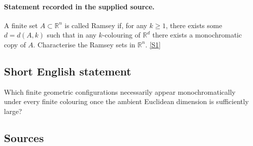 \documentclass[11pt,a4paper]{article}
\newcommand{\sref}[2]{\hyperlink{source:#1:#2}{[S#2]}}
\begin{document}
\paragraph{Statement recorded in the supplied source.}
A finite set $A\subset \mathbb{R}^n$ is called Ramsey if, for any $k\geq 1$, there exists some $d=d(A,k)$ such that in any $k$-colouring of $\mathbb{R}^d$ there exists a monochromatic copy of $A$. Characterise the Ramsey sets in $\mathbb{R}^n$. \sref{1975}{1}

\subsection{Short English statement}

Which finite geometric configurations necessarily appear monochromatically under every finite colouring once the ambient Euclidean dimension is sufficiently large?

\subsection{Sources}
\end{document}
